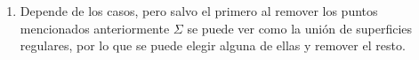\documentclass{homework}
\begin{document}
\begin{sol}
\begin{enumerate}
        \item Depende de los casos, pero salvo el primero al remover los puntos mencionados anteriormente \(\Sigma\) se puede ver como la unión de superficies regulares, por lo que se puede elegir alguna de ellas y remover el resto.
    \end{enumerate}
\end{sol}
\end{document}
